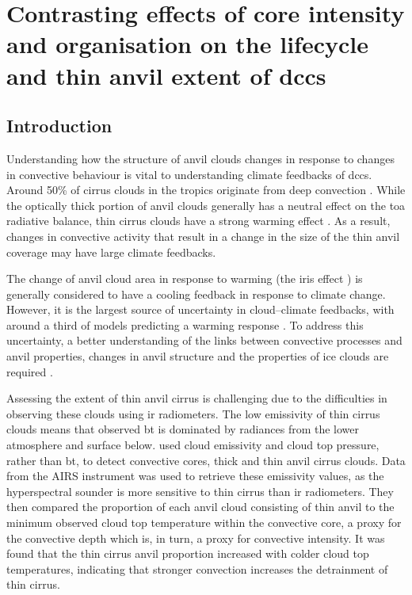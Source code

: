 \chapter{Contrasting effects of core intensity and organisation on the lifecycle and thin anvil extent of \acrshort{dcc}s} \label{chp:anvil_structure}

\section{Introduction}

Understanding how the structure of anvil clouds changes in response to changes in convective behaviour is vital to understanding climate feedbacks of \acrshort{dcc}s.
Around 50\% of cirrus clouds in the tropics originate from deep convection \citep{massie_distribution_2002, luo_characterizing_2004}.
While the optically thick portion of anvil clouds generally has a neutral effect on the \acrshort{toa} radiative balance, thin cirrus clouds have a strong warming effect \citep{berry_cloud_2014}.
As a result, changes in convective activity that result in a change in the size of the thin anvil coverage may have large climate feedbacks.

The change of anvil cloud area in response to warming (the iris effect \citep{lindzen_does_2001, bony_thermodynamic_2016}) is generally considered to have a cooling feedback in response to climate change.
However, it is the largest source of uncertainty in cloud--climate feedbacks, with around a third of models predicting a warming response \citep{sherwood_assessment_2020}.
To address this uncertainty, a better understanding of the links between convective processes and anvil properties, changes in anvil structure and the properties of ice clouds are required \citep{gasparini_opinion_2023}.

Assessing the extent of thin anvil cirrus is challenging due to the difficulties in observing these clouds using \acrshort{ir} radiometers.
The low emissivity of thin cirrus clouds means that observed \acrshort{bt} is dominated by radiances from the lower atmosphere and surface below.
\citet{protopapadaki_upper_2017} used cloud emissivity and cloud top pressure, rather than \acrshort{bt}, to detect convective cores, thick and thin anvil cirrus clouds.
Data from the AIRS instrument was used to retrieve these emissivity values, as the hyperspectral sounder is more sensitive to thin cirrus than \acrshort{ir} radiometers.
They then compared the proportion of each anvil cloud consisting of thin anvil to the minimum observed cloud top temperature within the convective core, a proxy for the convective depth which is, in turn, a proxy for convective intensity.
It was found that the thin cirrus anvil proportion increased with colder cloud top temperatures, indicating that stronger convection increases the detrainment of thin cirrus.

